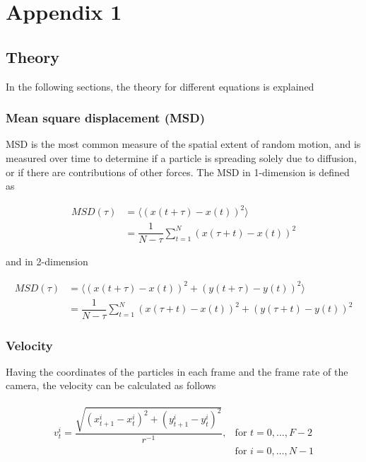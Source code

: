 \chapter{Appendix 1}

\section{Theory} \label{theory}

In the following sections, the theory for different equations is explained

\subsection{Mean square displacement (MSD)} \label{theory_msd}

MSD is the most common measure of the spatial extent of random motion, and is measured 
over time to determine if a particle is spreading solely due to diffusion, or if there 
are contributions of other forces\cite{tarantino2014tnf}. The MSD in 1-dimension is defined as

\begin{align}
    MSD(\tau)   &=  \langle (x(t+\tau)-x(t))^2\rangle \\
                &=  \dfrac{1}{N-\tau}\sum_{t=1}^{N}\left( x(\tau+t)-x(t)\right)^2
\end{align}

and in 2-dimension

\begin{align}
    MSD(\tau)   &=  \langle (x(t+\tau)-x(t))^2 + (y(t+\tau)-y(t))^2\rangle \label{eqn:2dim_msd}\\
                &=  \dfrac{1}{N-\tau}\sum_{t=1}^{N}\left( x(\tau+t)-x(t)\right)^2 + \left( y(\tau+t)-y(t)\right)^2
\end{align}

\subsection{Velocity} \label{theory_velocity}

Having the coordinates of the particles in each frame and the frame rate of the camera, 
the velocity can be calculated as follows

\begin{align}
    \begin{array}{lr}
        v_t^i = \dfrac{\sqrt{\left(x_{t+1}^i-x_t^i\right)^2+\left(y_{t+1}^i-y_t^i\right)^2}}{r^{-1}}, 
        & \text{for } t=0,\ldots,F-2\\
        & \text{for } i=0,\ldots,N-1
    \end{array}
    \label{eq:velocity_1par1}
\end{align}

